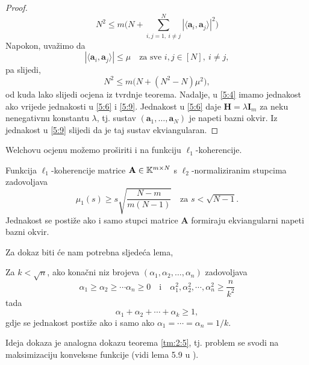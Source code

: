 \documentclass[a4paper,twoside,12pt]{memoir} %
\newcommand{\vect}[1]{\mathbf{#1}}
\renewcommand{\vec}{\vect}
\begin{document}
\begin{proof}
    \begin{equation}\label{5:8}
        N^2 \leq m \big( N + \sum_{i,j = 1,\ i \neq j}^N |\langle \vec a_i, \vec a_j \rangle|^2 \big)
    \end{equation}
    Napokon, uva\v{z}imo da 
    \begin{equation}\label{5:9}
        |\langle \vec a_i, \vec a_j \rangle| \leq \mu \quad \text{za sve }i,j \in [N],\ i \neq j,
    \end{equation}
    pa slijedi,
    \begin{equation*}
        N^2 \leq m \big( N + (N^2 - N)\mu^2 \big), 
    \end{equation*}
    od kuda lako slijedi ocjena iz tvrdnje teorema.
    Nadalje, u \eqref{5:4} imamo jednakost ako vrijede jednakosti u \eqref{5:6} i \eqref{5:9}. Jednakost u \eqref{5:6} daje $\vec H = \lambda \vec I_m$ za neku nenegativnu konstantu $\lambda$, tj. sustav $(\vec a_1, \dots, \vec a_N)$ je napeti bazni okvir. Iz jednakost u \eqref{5:9} slijedi da je taj sustav ekviangularan.
\end{proof}

Welchovu ocjenu mo\v{z}emo pro\v{s}iriti i na funkciju $\ell_1$-koherencije.
\begin{thm}\label{tm:5:8}
    Funkcija $\ell_1$-koherencije matrice $\vec A \in \K^{m \times N}$ s $\ell_2$-normaliziranim stupcima zadovoljava 
    \begin{equation}\label{5:10}
        \mu_1(s) \geq s \sqrt{\frac{N-m}{m(N-1)}}\quad \text{za } s < \sqrt{N - 1}.
    \end{equation}
    Jednakost se posti\v{z}e ako i samo stupci matrice $\vec A$ formiraju ekviangularni napeti bazni okvir.
\end{thm}
Za dokaz biti \'ce nam potrebna sljede\'ca lema,
\begin{lem}\label{lem:5:9}
    Za $k < \sqrt{n}$, ako kona\v{c}ni niz brojeva $(\alpha_1, \alpha_2, \dots, \alpha_n)$ zadovoljava
    \begin{equation*}
        \alpha_1 \geq \alpha_2 \geq \cdots \alpha_n \geq 0 \quad \text{i} \quad \alpha_1^2,\alpha_2^2, \cdots,\alpha_n^2 \geq \frac{n}{k^2} 
    \end{equation*}
    tada
    \begin{equation*}
        \alpha_1 + \alpha_2 + \cdots + \alpha_k \geq 1, 
    \end{equation*}
    gdje se jednakost posti\v{z}e ako i samo ako $\alpha_1 = \cdots = \alpha_n = 1/k$.
\end{lem}
Ideja dokaza je analogna dokazu teorema \ref{tm:2:5}, tj. problem se svodi na maksimizaciju konveksne funkcije (vidi lema 5.9 u \cite{foucart13}).
\end{document}
